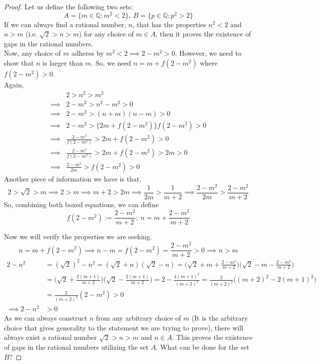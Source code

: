 \noindent\begin{proof}
    Let us define the following two sets:
$$A=\{m\in\mathbb{Q}:m^2<2\},\ B=\{p\in\mathbb{Q}:p^2>2\}$$
If we can always find a rational number, $n$, that has the properties $n^2<2$ and $n>m$ (i.e. $\sqrt{2}>n>m$) for any choice of $m\in A$, then it proves the existence of gaps in the rational numbers.\\
Now, any choice of $m$ adheres by $m^2<2\implies2-m^2>0$. However, we need to show that $n$ is larger than $m$. So, we need $n=m+f(2-m^2)$ where $f(2-m^2)>0$.\footnotemark\\
\noindent Again,
\begin{align}
    & 2>n^2>m^2\nonumber\\
    \implies& 2-m^2>n^2-m^2>0\nonumber\\
    \implies& 2-m^2>(n+m)(n-m)>0\nonumber\\
    \implies& 2-m^2>\{2m+f(2-m^2)\}f(2-m^2)>0\nonumber\\
    \implies& \frac{2-m^2}{f(2-m^2)}>2m+f(2-m^2)>0\nonumber\\
    \implies& \frac{2-m^2}{f(2-m^2)}>2m+f(2-m^2)>2m>0\nonumber\\
    \implies& \boxed{\frac{2-m^2}{2m}>f(2-m^2)>0}\nonumber
\end{align}
Another piece of information we have is that,
\begin{equation*}
    2>\sqrt{2}>m\implies 2>m\implies m+2>2m\implies \frac{1}{2m}>\frac{1}{m+2}\implies \boxed{\frac{2-m^2}{2m}>\frac{2-m^2}{m+2}}
\end{equation*}
So, combining both boxed equations, we can define\footnotemark{} $$\boxed{f(2-m^2):=\frac{2-m^2}{m+2};\ n=m+\frac{2-m^2}{m+2}}$$

Now we will verify the properties we are seeking.
$$n=m+f(2-m^2)\implies n-m=f(2-m^2)=\frac{2-m^2}{m+2}>0\implies n>m$$
\begin{align*}
    2-n^2&=(\sqrt{2})^2-n^2=(\sqrt{2}+n)(\sqrt{2}-n)=\big(\sqrt{2}+m+\frac{2-m^2}{m+2}\big)\big(\sqrt{2}-m-\frac{2-m^2}{m+2}\big)\\
    &=\big(\sqrt{2}+\frac{2(m+1)}{m+2}\big)\big(\sqrt{2}-\frac{2(m+1)}{m+2}\big)=2-\frac{4(m+1)^2}{(m+2)^2}=\frac{2}{(m+2)^2}\big((m+2)^2-2(m+1)^2\big)\\
    &=\frac{2}{(m+2)^2}(2-m^2)>0\\
    \implies2-n^2 &>0
\end{align*}
As we can always construct $n$ from any arbitrary choice of $m$ (It is the arbitrary choice that gives generality to the statement we are trying to prove), there will always exist a rational number $\sqrt{2}>n>m$ and $n\in A$. This proves the existence of gaps in the rational numbers utilizing the set $A$. What can be done for the set $B$?
\end{proof}
